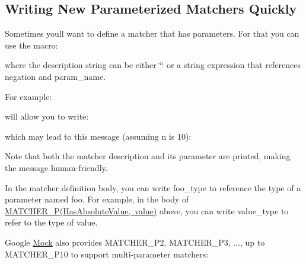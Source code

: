 \subsection*{Writing New Parameterized Matchers Quickly}

Sometimes you\textquotesingle{}ll want to define a matcher that has parameters. For that you can use the macro\+: 
\begin{DoxyCode}{0}
\end{DoxyCode}
 where the description string can be either {\ttfamily \char`\"{}\char`\"{}} or a string expression that references {\ttfamily negation} and {\ttfamily param\+\_\+name}.

For example\+: 
\begin{DoxyCode}{0}
\end{DoxyCode}
 will allow you to write\+: 
\begin{DoxyCode}{0}
\end{DoxyCode}
 which may lead to this message (assuming {\ttfamily n} is 10)\+: 
\begin{DoxyCode}{0}
\end{DoxyCode}


Note that both the matcher description and its parameter are printed, making the message human-\/friendly.

In the matcher definition body, you can write {\ttfamily foo\+\_\+type} to reference the type of a parameter named {\ttfamily foo}. For example, in the body of {\ttfamily \mbox{\hyperlink{gmock-generated-matchers_8h_acb7ae915efa2fd8d3f6ea7313198afb6}{M\+A\+T\+C\+H\+E\+R\+\_\+\+P(\+Has\+Absolute\+Value, value)}}} above, you can write {\ttfamily value\+\_\+type} to refer to the type of {\ttfamily value}.

Google \mbox{\hyperlink{classMock}{Mock}} also provides {\ttfamily M\+A\+T\+C\+H\+E\+R\+\_\+\+P2}, {\ttfamily M\+A\+T\+C\+H\+E\+R\+\_\+\+P3}, ..., up to {\ttfamily M\+A\+T\+C\+H\+E\+R\+\_\+\+P10} to support multi-\/parameter matchers\+: 
\begin{DoxyCode}{0}
\end{DoxyCode}


